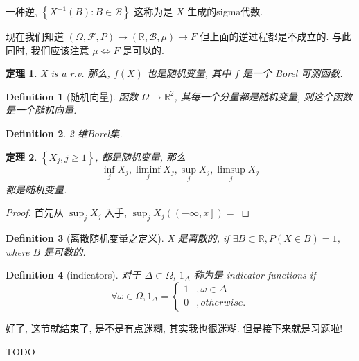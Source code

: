 \documentclass[a4paper, 10pt]{ctexart} %
\newtheorem{theorem}{定理}
\newtheorem{definition}{Definition}
\begin{document}
一种逆, $\left\{ X ^{-1}  \left(B\right) : B \in \mathcal B \right\}$ 这称为是 $X$ 生成的sigma代数. 

现在我们知道 $\left( \Omega , \mathcal F , P\right) \to \left( \mathbb{R} , \mathcal B , \mu\right) \to F$
但上面的逆过程都是不成立的. 与此同时, 我们应该注意 $\mu \iff  F$ 是可以的. 
\begin{theorem}
    X is a r.v. 那么, $f \left(X\right)$ 也是随机变量, 其中 $f$ 是一个 Borel 可测函数. 
\end{theorem}
\begin{definition}[随机向量]
    函数 $\Omega \to \mathbb{R} ^{2}$, 其每一个分量都是随机变量, 则这个函数是一个随机向量.
\end{definition}
\begin{definition}
    2 维Borel集.
\end{definition}

\begin{theorem}
    $\left\{ X_j , j \ge 1\right\}$, 都是随机变量, 那么
    \[
    \inf_{j} X_j, \liminf _{j} X_j , \sup_{j}  X_j ,  \limsup_{j} X_j 
    \]
    都是随机变量. 
\end{theorem}
\begin{proof}
    首先从 $\sup_{j}  X_{j}$ 入手, 
    $\sup_{j} X_j  \left( \left( -\infty ,x \right]\right) = $
\end{proof}

\begin{definition}[离散随机变量之定义]
    X 是离散的, if $\exists B \subset \mathbb{R} , P\left( X \in B\right) =1$, where
    $B$ 是可数的.
\end{definition}
\begin{definition}[indicators]
    对于 $\Delta \subset \Omega$, 
    $1_{\Delta}$ 称为是 indicator functions if
    \[
    \forall \omega\in \Omega ,1_{\Delta} =
    \begin{cases}
        1 & , \omega \in \Delta \\
        0 & , otherwise.
    \end{cases}
    \]
\end{definition}

好了, 这节就结束了, 是不是有点迷糊, 其实我也很迷糊. 
但是接下来就是习题啦! 

TODO
\end{document}
